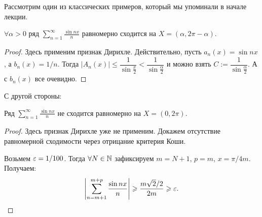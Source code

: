 \documentclass[a4paper, 12pt]{article}
\begin{document}
	
	Рассмотрим один из классических примеров, который мы упоминали в начале лекции.
	\begin{Examples}
		$\forall \alpha > 0$ ряд $\sum\limits_{n = 1}^\infty \frac{\sin nx}{n}$ равномерно сходится на $X=(\alpha, 2\pi-\alpha)$.
	\end{Examples}
	
	\begin{proof} 
	Здесь применим признак Дирихле. Действительно, пусть $a_n(x) = \sin nx$, а $b_n(x) = 1/n$. Тогда $|A_n(x)| \leq \dfrac{1}{\sin \frac{x}{2}} < \dfrac{1}{\sin \frac{\alpha}{2}}$ и можно взять $C:= \dfrac{1}{\sin \frac{\alpha}{2}}$. А с $b_n(x)$ все очевидно.
	\end{proof}
	
	С другой стороны:
	\begin{Examples}
		Ряд $\sum\limits_{n = 1}^\infty \frac{\sin nx}{n}$ не сходится равномерно на $X=(0, 2\pi)$.
	\end{Examples}
	\begin{proof}
		Здесь признак Дирихле уже не применим. Докажем отсутствие равномерной сходимости через отрицание критерия Коши.
		
		Возьмем $\varepsilon = 1/100$. Тогда $\forall N \in \mathbb{N}$ зафиксируем $m = N+1$, $p = m$, $x = \pi/4m$. Получаем:
		$$
		\left| \sum\limits_{n=m+1}^{m+p} \frac{\sin nx}{n} \right| \geqslant \dfrac{m\sqrt{2} / 2}{2m} \geqslant \varepsilon.
		$$
	\end{proof}
\end{document}
